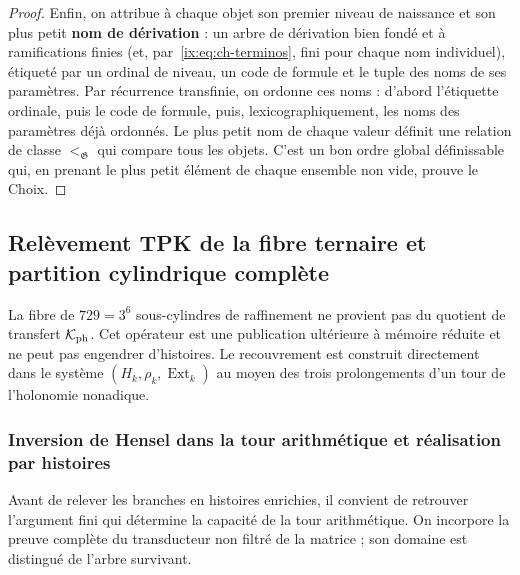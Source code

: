 \begin{proof}
Enfin, on attribue à chaque objet son premier niveau de naissance et son
plus petit \textbf{nom de dérivation} : un arbre de dérivation bien fondé et
à ramifications finies (et, par~\eqref{ix:eq:ch-terminos}, fini pour chaque nom individuel), étiqueté par un
ordinal de niveau, un code de formule et le tuple des noms de ses paramètres.
Par récurrence transfinie, on ordonne ces noms : d’abord l’étiquette ordinale,
puis le code de formule, puis, lexicographiquement, les noms des
paramètres déjà ordonnés. Le plus petit nom de chaque valeur définit une relation de
classe \(<_{\mathfrak G}\) qui compare tous les objets. C’est un bon ordre
global définissable qui, en prenant le plus petit élément de chaque ensemble non vide,
prouve le Choix.
\end{proof}


\subsection{Relèvement TPK de la fibre ternaire et partition cylindrique complète}
\label{ix:subsec:elevacion-catalogal-ch}

La fibre de \(729=3^6\) sous-cylindres de raffinement ne provient pas du quotient de transfert
\(\mathcal K_{\rm ph}\). Cet opérateur est une publication ultérieure à mémoire
réduite et ne peut pas engendrer d’histoires. Le recouvrement est construit directement
dans le système \((H_k,\rho_k,\operatorname{Ext}_k)\) au moyen des trois
prolongements d’un tour de l’holonomie nonadique.


\subsubsection{Inversion de Hensel dans la tour arithmétique et réalisation par histoires}
\label{ix:sec:ch-capacidad-hensel}

Avant de relever les branches en histoires enrichies, il convient de retrouver
l’argument fini qui détermine la capacité de la tour arithmétique. On
incorpore la preuve complète du transducteur non filtré de la matrice ; son
domaine est distingué de l’arbre survivant.

